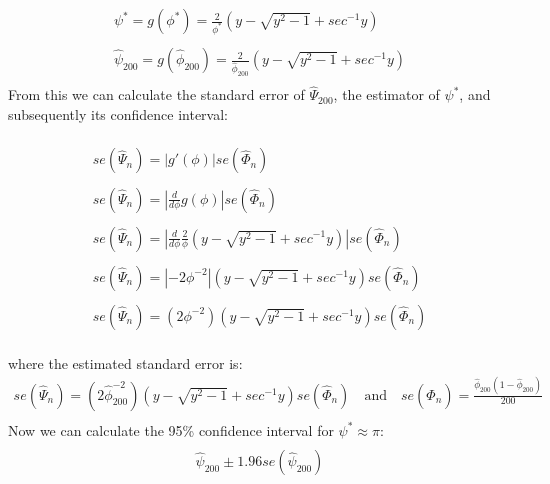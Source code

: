 \begin{displaymath}
\begin{array}{l}
\\\psi^*=g(\phi^*)=\frac{2}{\phi^*}(y-\sqrt{y^2-1}+sec^{-1}y)\\
\\\hat{\psi}_{200}=g(\hat{\phi}_{200})=\frac{2}{\hat{\phi}_{200}}(y-\sqrt{y^2-1}+sec^{-1}y)\\
\end{array}
\end{displaymath}
\noindent
From this we can calculate the standard error of $\hat{\Psi}_{200}$, the estimator of $\psi^*$, and subsequently its confidence interval:

\begin{displaymath}
\begin{array}{l}
\\se(\hat{\Psi}_n)=|g'( \phi)| se(\hat{\Phi}_n)\\
\\se(\hat{\Psi}_n)=|\frac{d}{d \phi}g( \phi)| se(\hat{\Phi}_n)\\
\\se(\hat{\Psi}_n)=|\frac{d}{d \phi}\frac{2}{ \phi}(y-\sqrt{y^2-1}+sec^{-1}y)| se(\hat{\Phi}_n)\\
\\se(\hat{\Psi}_n)=|-2 \phi^{-2}| (y-\sqrt{y^2-1}+sec^{-1}y) se(\hat{\Phi}_n)\\
\\se(\hat{\Psi}_n)=(2 \phi^{-2}) (y-\sqrt{y^2-1}+sec^{-1}y) se(\hat{\Phi}_n)\\
\end{array}
\end{displaymath}

\noindent
where the estimated standard error is:
\begin{displaymath}
\begin{array}{l}
se(\hat{\Psi}_n)=(2 \hat{\phi}_{200}^{-2}) (y-\sqrt{y^2-1}+sec^{-1}y) se(\hat{\Phi}_n) \quad \text{and} \quad se(\hat{\Phi}_n)=\frac{\hat{\phi}_{200} (1-\hat{\phi}_{200})}{200}\\
\end{array}
\end{displaymath}
Now we can calculate the 95\% confidence interval for $\psi^*\approx\pi$:
\begin{displaymath}
\begin{array}{l}
\\\hat{\psi}_{200}\pm1.96 se(\hat{\psi}_{200})\\
\end{array}
\end{displaymath}

